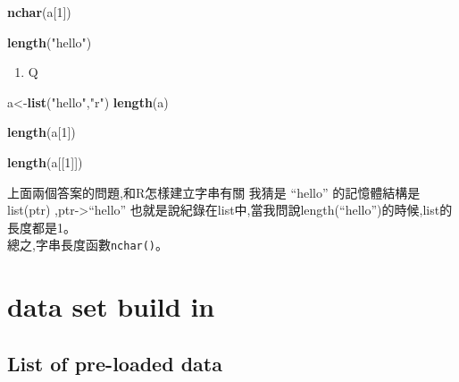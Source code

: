 \documentclass[]{book}
\newenvironment{Shaded}{\begin{snugshade}}{\end{snugshade}}
\newcommand{\KeywordTok}[1]{\textcolor[rgb]{0.13,0.29,0.53}{\textbf{#1}}}
\newcommand{\DecValTok}[1]{\textcolor[rgb]{0.00,0.00,0.81}{#1}}
\newcommand{\StringTok}[1]{\textcolor[rgb]{0.31,0.60,0.02}{#1}}
\newcommand{\NormalTok}[1]{#1}
\providecommand{\tightlist}{%
  \setlength{\itemsep}{0pt}\setlength{\parskip}{0pt}}
\theoremstyle{definition}
\theoremstyle{definition}
\theoremstyle{definition}
\theoremstyle{remark}
\begin{document}
\begin{Shaded}
\begin{Highlighting}[]
\KeywordTok{nchar}\NormalTok{(a[}\DecValTok{1}\NormalTok{])}
\end{Highlighting}
\end{Shaded}

\begin{Shaded}
\begin{Highlighting}[]
\KeywordTok{length}\NormalTok{(}\StringTok{"hello"}\NormalTok{)}
\end{Highlighting}
\end{Shaded}

\begin{enumerate}
\def\labelenumi{\arabic{enumi}.}
\tightlist
\item
  Q
\end{enumerate}

\begin{Shaded}
\begin{Highlighting}[]
\NormalTok{a<-}\KeywordTok{list}\NormalTok{(}\StringTok{"hello"}\NormalTok{,}\StringTok{"r"}\NormalTok{)}
\KeywordTok{length}\NormalTok{(a)}
\end{Highlighting}
\end{Shaded}

\begin{Shaded}
\begin{Highlighting}[]
\KeywordTok{length}\NormalTok{(a[}\DecValTok{1}\NormalTok{])}
\end{Highlighting}
\end{Shaded}

\begin{Shaded}
\begin{Highlighting}[]
\KeywordTok{length}\NormalTok{(a[[}\DecValTok{1}\NormalTok{]])}
\end{Highlighting}
\end{Shaded}

上面兩個答案的問題,和R怎樣建立字串有關 我猜是 ``hello'' 的記憶體結構是
list(ptr) ,ptr-\textgreater{}``hello''
也就是說紀錄在list中,當我問說length(``hello'')的時候,list的長度都是1。\\
總之,字串長度函數\texttt{nchar()}。

\section{data set build in}\label{data-set-build-in}

\subsection{List of pre-loaded data}\label{list-of-pre-loaded-data}
\end{document}
